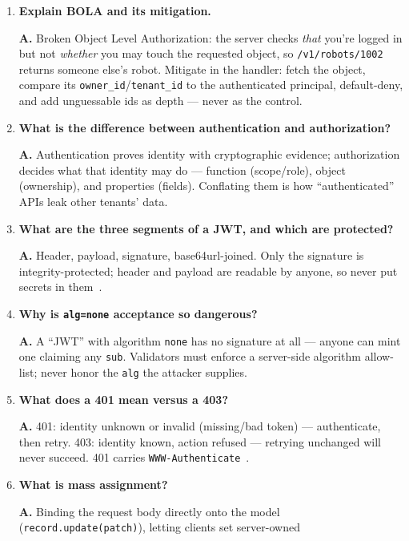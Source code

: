 \begin{enumerate}[label=\textbf{Q\arabic*.}, leftmargin=1.7cm, itemsep=0.9em]
  \item \textbf{Explain BOLA and its mitigation.}\par
        \textbf{A.} Broken Object Level Authorization: the server checks
        \emph{that} you're logged in but not \emph{whether} you may touch
        the requested object, so \texttt{/v1/robots/1002} returns someone
        else's robot. Mitigate in the handler: fetch the object, compare
        its \texttt{owner\_id}/\texttt{tenant\_id} to the authenticated
        principal, default-deny, and add unguessable ids as depth ---
        never as the control.
  \item \textbf{What is the difference between authentication and
        authorization?}\par
        \textbf{A.} Authentication proves identity with cryptographic
        evidence; authorization decides what that identity may do ---
        function (scope/role), object (ownership), and properties
        (fields). Conflating them is how ``authenticated'' APIs leak other
        tenants' data.
  \item \textbf{What are the three segments of a JWT, and which are
        protected?}\par
        \textbf{A.} Header, payload, signature, base64url-joined. Only the
        signature is integrity-protected; header and payload are readable
        by anyone, so never put secrets in them~\cite{rfc7519}.
  \item \textbf{Why is \texttt{alg=none} acceptance so dangerous?}\par
        \textbf{A.} A ``JWT'' with algorithm \texttt{none} has no
        signature at all --- anyone can mint one claiming any
        \texttt{sub}. Validators must enforce a server-side algorithm
        allow-list; never honor the \texttt{alg} the attacker supplies.
  \item \textbf{What does a 401 mean versus a 403?}\par
        \textbf{A.} 401: identity unknown or invalid (missing/bad token)
        --- authenticate, then retry. 403: identity known, action refused
        --- retrying unchanged will never succeed. 401 carries
        \texttt{WWW-Authenticate}~\cite{rfc9110}.
  \item \textbf{What is mass assignment?}\par
        \textbf{A.} Binding the request body directly onto the model
        (\texttt{record.update(patch)}), letting clients set server-owned

\end{enumerate}
